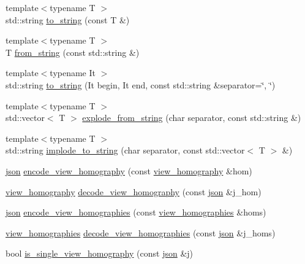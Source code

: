 \begin{DoxyCompactItemize}
{\footnotesize template$<$typename T $>$ }\\std\+::string \hyperlink{namespacetlz_a8e4f8c8c2927bc4350de13bfa0f8f9e1}{to\+\_\+string} (const T \&)
\item 
{\footnotesize template$<$typename T $>$ }\\T \hyperlink{namespacetlz_af4daa51f95e963823c59154331d953ba}{from\+\_\+string} (const std\+::string \&)
\item 
{\footnotesize template$<$typename It $>$ }\\std\+::string \hyperlink{namespacetlz_afe6e34b66575afebc47d3cfde0c20e88}{to\+\_\+string} (It begin, It end, const std\+::string \&separator=\char`\"{}, \char`\"{})
\item 
{\footnotesize template$<$typename T $>$ }\\std\+::vector$<$ T $>$ \hyperlink{namespacetlz_adc43ea7837b728f3db6b23b816bbb67a}{explode\+\_\+from\+\_\+string} (char separator, const std\+::string \&)
\item 
{\footnotesize template$<$typename T $>$ }\\std\+::string \hyperlink{namespacetlz_ac5a8e7492b29180b32e26501a54ff36c}{implode\+\_\+to\+\_\+string} (char separator, const std\+::vector$<$ T $>$ \&)
\item 
\hyperlink{namespacetlz_ac400657dfcddf6309a769aefc23eed0c}{json} \hyperlink{namespacetlz_a1a6da36ecd0f152dec63f309b9cb9504}{encode\+\_\+view\+\_\+homography} (const \hyperlink{structtlz_1_1view__homography}{view\+\_\+homography} \&hom)
\item 
\hyperlink{structtlz_1_1view__homography}{view\+\_\+homography} \hyperlink{namespacetlz_acc042de1df74e590015a1efe234a338c}{decode\+\_\+view\+\_\+homography} (const \hyperlink{namespacetlz_ac400657dfcddf6309a769aefc23eed0c}{json} \&j\+\_\+hom)
\item 
\hyperlink{namespacetlz_ac400657dfcddf6309a769aefc23eed0c}{json} \hyperlink{namespacetlz_a421abcd03726bf6a47bd0c518260af77}{encode\+\_\+view\+\_\+homographies} (const \hyperlink{namespacetlz_abd9713860da221719662169bd1821a9d}{view\+\_\+homographies} \&homs)
\item 
\hyperlink{namespacetlz_abd9713860da221719662169bd1821a9d}{view\+\_\+homographies} \hyperlink{namespacetlz_a2b9ca660faf3db42377043477bcee30b}{decode\+\_\+view\+\_\+homographies} (const \hyperlink{namespacetlz_ac400657dfcddf6309a769aefc23eed0c}{json} \&j\+\_\+homs)
\item 
bool \hyperlink{namespacetlz_a85a6b8de7967e1850e339011044322c5}{is\+\_\+single\+\_\+view\+\_\+homography} (const \hyperlink{namespacetlz_ac400657dfcddf6309a769aefc23eed0c}{json} \&j)

\end{DoxyCompactItemize}
